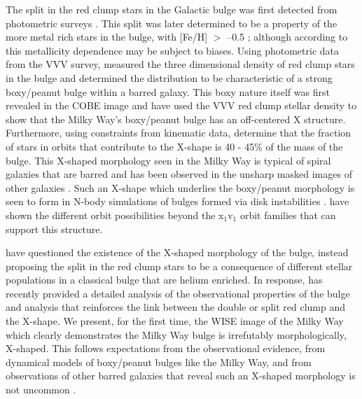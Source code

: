 \documentclass[12pt, preprint]{aastex}
\begin{document}
%
The split in the red clump stars in the Galactic bulge was first detected from photometric surveys \citep{McWilliam2010, Nataf2010}. This split was later determined to be a property of the more metal rich stars in the bulge, with [Fe/H] $>$ --0.5 \citep{Ness2012, Uttenthaler2012}; although according to \citet{Nataf2014} this metallicity dependence may be subject to biases. Using photometric data from the VVV survey, \citet{Wegg2013} measured the three dimensional density of red clump stars in the bulge and determined the distribution to be characteristic of a strong boxy/peanut bulge within a barred galaxy. This boxy nature itself was first revealed in the COBE image \citep{Dwek1995} and \citet{Portail2015a} have used the VVV red clump stellar density to show that the Milky Way's boxy/peanut bulge has an off-centered X structure. Furthermore, using constraints from kinematic data, \citet{Portail2015b}  determine that the fraction of stars in orbits that contribute to the X-shape is 40 - 45\% of the mass of the bulge. This X-shaped morphology seen in the Milky Way is typical of spiral galaxies that are barred and has been observed in the unsharp masked images of other galaxies \citep[e.g.][]{Bureau2006}. Such an X-shape which underlies the boxy/peanut morphology is seen to form in N-body simulations of bulges formed via disk instabilities \citep[e.g.][]{Athanassoula2005, Debattista2006, Inma2006}. \citet{Portail2015b} have shown the different orbit possibilities beyond the x$_{1}$v$_{1}$ orbit families \citep[e.g.][]{P1991} that can support this structure.



\citet{Lee2015} have questioned the existence of the X-shaped morphology of the bulge, instead proposing the split in the red clump stars to be a consequence of different stellar populations in a classical bulge that are helium enriched. In response, \citet{Gonzalez2015} has recently provided a detailed analysis of the observational properties of the bulge and analysis that reinforces the link between the double or split red clump and the X-shape. We present, for the first time, the WISE image of the Milky Way \citep{Lang2014a} which clearly demonstrates the Milky Way bulge is irrefutably morphologically, X-shaped. This follows expectations from the observational evidence,  from dynamical models of boxy/peanut bulges like the Milky Way, and from observations of other barred galaxies that reveal such an X-shaped morphology is not uncommon \citep{L2014}. 
\end{document}
